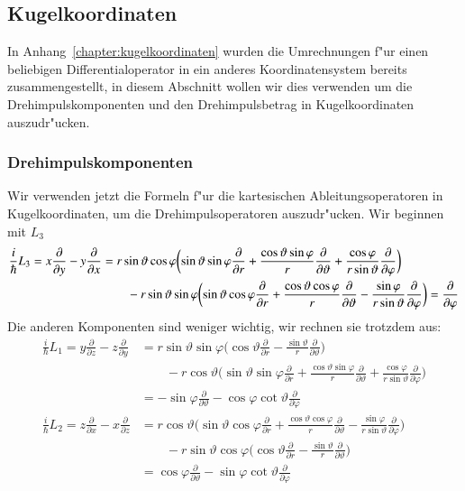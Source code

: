 \subsection{Kugelkoordinaten}
In Anhang~\ref{chapter:kugelkoordinaten} wurden die Umrechnungen f"ur
einen beliebigen Differentialoperator in ein anderes Koordinatensystem
bereits zusammengestellt, in diesem Abschnitt wollen wir dies verwenden
um die Drehimpulskomponenten und den Drehimpulsbetrag in Kugelkoordinaten
auszudr"ucken.
\subsubsection{Drehimpulskomponenten}
Wir verwenden jetzt die Formeln f"ur die kartesischen Ableitungsoperatoren
in Kugelkoordinaten, um die Drehimpulsoperatoren auszudr"ucken.
Wir beginnen mit $L_3$
\begin{align}
\frac{i}{\hbar}
L_3
=
x\frac{\partial}{\partial y}
-
y\frac{\partial}{\partial x}
&=
r\sin\vartheta\cos\varphi
\biggl(
\sin\vartheta\sin\varphi
\frac{\partial}{\partial r}
+
\frac{\cos\vartheta\sin\varphi}{r}
\frac{\partial}{\partial\vartheta}
+
\frac{\cos\varphi}{r\sin\vartheta}
\frac{\partial}{\partial\varphi}
\biggr)
\notag
\\
&\qquad
-
r\sin\vartheta\sin\varphi
\biggl(
\sin\vartheta\cos\varphi
\frac{\partial}{\partial r}
+
\frac{\cos\vartheta\cos\varphi}{r}
\frac{\partial}{\partial\vartheta}
-
\frac{\sin\varphi}{r\sin\vartheta}
\frac{\partial}{\partial\varphi}
\biggr)
=
\frac{\partial}{\partial\varphi}
\label{l3spherical}
\end{align}
Die anderen Komponenten sind weniger wichtig, wir rechnen sie trotzdem
aus:
\begin{align*}
\frac{i}{\hbar}L_1
=
y\frac{\partial}{\partial z}-z\frac{\partial}{\partial y}
&=
r\sin\vartheta\sin\varphi
\biggl(
\cos\vartheta
\frac{\partial}{\partial r}
-
\frac{\sin\vartheta}{r}
\frac{\partial}{\partial\vartheta}
\biggr)
\\
&\qquad
-
r\cos\vartheta
\biggl(
\sin\vartheta\sin\varphi
\frac{\partial}{\partial r}
+
\frac{\cos\vartheta\sin\varphi}{r}
\frac{\partial}{\partial\vartheta}
+
\frac{\cos\varphi}{r\sin\vartheta}
\frac{\partial}{\partial\varphi}
\biggr)
\\
&=
-\sin\varphi\frac{\partial}{\partial\vartheta}
-\cos\varphi\cot\vartheta\frac{\partial}{\partial\varphi}
\\
\frac{i}{\hbar}L_2
=
z\frac{\partial}{\partial x}-x\frac{\partial}{\partial z}
&=
r\cos\vartheta
\biggl(
\sin\vartheta\cos\varphi
\frac{\partial}{\partial r}
+
\frac{\cos\vartheta\cos\varphi}{r}
\frac{\partial}{\partial\vartheta}
-
\frac{\sin\varphi}{r\sin\vartheta}
\frac{\partial}{\partial\varphi}
\biggr)
\\
&\qquad
-
r\sin\vartheta\cos\varphi
\biggl(
\cos\vartheta
\frac{\partial}{\partial r}
-
\frac{\sin\vartheta}{r}
\frac{\partial}{\partial\vartheta}
\biggr)
\\
&=
\cos\varphi\frac{\partial}{\partial\vartheta}
-\sin\varphi\cot\vartheta\frac{\partial}{\partial\varphi}
\end{align*}
